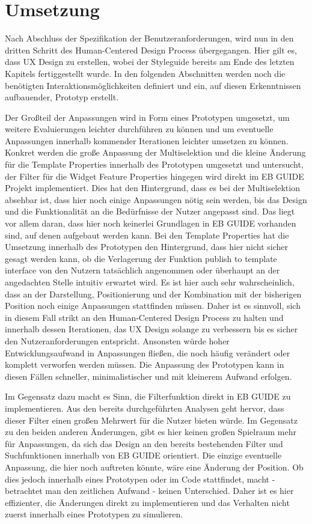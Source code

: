 \chapter{Umsetzung}\label{ch:experiments}

Nach Abschluss der Spezifikation der Benutzeranforderungen, wird nun in den dritten Schritt des Human-Centered Design Process übergegangen.
Hier gilt es, dass UX Design zu erstellen, wobei der Styleguide bereits am Ende des letzten Kapitels fertiggestellt wurde.
In den folgenden Abschnitten werden noch die benötigten Interaktionsmöglichkeiten definiert und ein, auf diesen Erkenntnissen aufbauender, Prototyp erstellt.

Der Großteil der Anpassungen wird in Form eines Prototypen umgesetzt, um weitere Evaluierungen leichter durchführen zu können und um eventuelle Anpassungen innerhalb kommender Iterationen leichter umsetzen zu können.
Konkret werden die große Anpassung der Multiselektion und die kleine Änderung für die Template Properties innerhalb des Prototypen umgesetzt und untersucht, der Filter für die Widget Feature Properties hingegen wird direkt im EB GUIDE Projekt implementiert.
Dies hat den Hintergrund, dass es bei der Multiselektion absehbar ist, dass hier noch einige Anpassungen nötig sein werden, bis das Design und die Funktionalität an die Bedürfnisse der Nutzer angepasst sind.
Das liegt vor allem daran, dass hier noch keinerlei Grundlagen in EB GUIDE vorhanden sind, auf denen aufgebaut werden kann.
Bei den Template Properties hat die Umsetzung innerhalb des Prototypen den Hintergrund, dass hier nicht sicher gesagt werden kann, ob die Verlagerung der Funktion \glqq publish to template interface\grqq{} von den Nutzern tatsächlich angenommen oder überhaupt an der angedachten Stelle intuitiv erwartet wird.
Es ist hier auch sehr wahrscheinlich, dass an der Darstellung, Positionierung und der Kombination mit der bisherigen Position noch einige Anpassungen stattfinden müssen.
Daher ist es sinnvoll, sich in diesem Fall strikt an den Human-Centered Design Process zu halten und innerhalb dessen Iterationen, das UX Design solange zu verbessern bis es sicher den Nutzeranforderungen entspricht.
Ansonsten würde hoher Entwicklungsaufwand in Anpassungen fließen, die noch häufig verändert oder komplett verworfen werden müssen.
Die Anpassung des Prototypen kann in diesen Fällen schneller, minimalistischer und mit kleinerem Aufwand erfolgen.

Im Gegensatz dazu macht es Sinn, die Filterfunktion direkt in EB GUIDE zu implementieren.
Aus den bereits durchgeführten Analysen geht hervor, dass dieser Filter einen großen Mehrwert für die Nutzer bieten würde.
Im Gegensatz zu den beiden anderen Änderungen, gibt es hier keinen großen Spielraum mehr für Anpassungen, da sich das Design an den bereits bestehenden Filter und Suchfunktionen innerhalb von EB GUIDE orientiert.
Die einzige eventuelle Anpassung, die hier noch auftreten könnte, wäre eine Änderung der Position.
Ob dies jedoch innerhalb eines Prototypen oder im Code stattfindet, macht - betrachtet man den zeitlichen Aufwand - keinen Unterschied.
Daher ist es hier effizienter, die Änderungen direkt zu implementieren und das Verhalten nicht zuerst innerhalb eines Prototypen zu simulieren.

